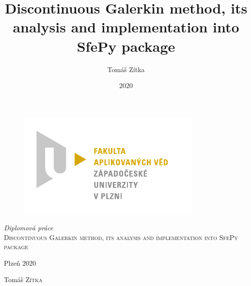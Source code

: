 \documentclass[openany]{book}
\title{Discontinuous Galerkin method, its analysis and implementation into SfePy package}
\author{Tomáš Zítka}
\date{$2020$}
\theoremstyle{definition}
\numberwithin{equation}{section}
\numberwithin{table}{section}
\begin{document}
\begin{titlepage}
	\begin{figure}[h]
 	 \centering
 	 \includegraphics[scale=1]{./fav_cmyk.pdf}
 	\end{figure}
 	\center %

	\textit{{\large Diplomová práce}}\\[1.5cm]
	\textsc{\LARGE  Discontinuous Galerkin method, its analysis and
	implementation into SfePy package}\\

	\vfill
	\begin{minipage}{0.4 \textwidth}
		\begin{flushleft}
			Plzeň $2020$
		\end{flushleft}
	\end{minipage}
	\begin{minipage}{0.4\textwidth}
		\begin{flushright}
            Tomáš \textsc{Zítka}\\
		\end{flushright}
	\end{minipage}
\end{titlepage}
\end{document}
